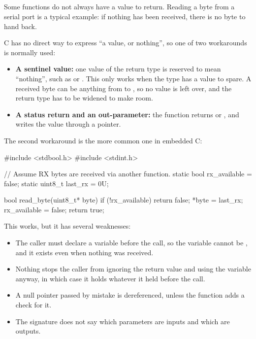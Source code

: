 \subsection{}
\label{c1:sec:optional}
Some functions do not always have a value to return. Reading a byte from a serial port is a typical
example: if nothing has been received, there is no byte to hand back.

C has no direct way to express ``a value, or nothing'', so one of two workarounds is normally used:
\begin{itemize}
  \item \textbf{A sentinel value:} one value of the return type is reserved to mean ``nothing'',
    such as  or . This only works when the type has a value to spare. A
    received byte can be anything from  to , so no value is left over, and
    the return type has to be widened to make room.
  \item \textbf{A status return and an out-parameter:} the function returns  or
    , and writes the value through a pointer.
\end{itemize}
The second workaround is the more common one in embedded C:

\begin{ccode}
#include <stdbool.h>
#include <stdint.h>

// Assume RX bytes are received via another function.
static bool rx_available = false;
static uint8_t last_rx   = 0U;

bool read_byte(uint8_t* byte)
{
    if (!rx_available) { return false; }
    *byte        = last_rx;
    rx_available = false;
    return true;
}
\end{ccode}

\noindent This works, but it has several weaknesses:
\begin{itemize}
  \item The caller must declare a variable before the call, so the variable cannot be
    , and it exists even when nothing was received.
  \item Nothing stops the caller from ignoring the return value and using the variable anyway, in
    which case it holds whatever it held before the call.
  \item A null pointer passed by mistake is dereferenced, unless the function adds a check for
    it.
  \item The signature does not say which parameters are inputs and which are outputs.
\end{itemize}

